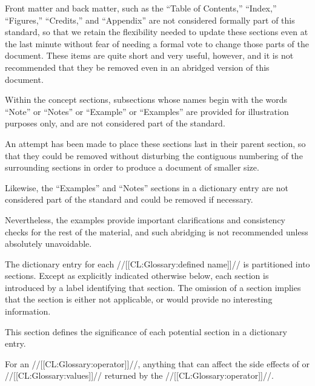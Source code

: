 \endlist

\endsubSection%

 

Front matter and back matter, such as the ``Table of Contents,''  ``Index,'' ``Figures,'' ``Credits,'' and ``Appendix'' are not considered formally  part of this standard, so that we retain the flexibility needed to update these sections even at the last minute without fear of needing a formal  vote to change those parts of the document.  These items are quite short  and very useful, however, and it is not recommended that they be removed  even in an abridged version of this document.

Within the concept sections, subsections whose names begin with  the words ``Note'' or ``Notes'' or ``Example'' or ``Examples''  are provided for illustration purposes only, and are not considered part of the standard.

An attempt has been made to place these sections last in their parent section, so that they could be removed without disturbing the contiguous numbering of the  surrounding sections in order to produce a document of smaller size.

Likewise, the ``Examples'' and ``Notes'' sections in a dictionary entry are not considered part of the standard and could be removed if necessary.

Nevertheless, the examples provide important clarifications and consistency  checks for the rest of the material, and such abridging is not recommended unless absolutely unavoidable.

\endsubsection%

 

The dictionary entry for each //[[CL:Glossary:defined name]]// is partitioned into sections.  Except as explicitly indicated otherwise below, each section is introduced by a label identifying that section.  The omission of a section implies that the section is either not applicable, or would provide no interesting information.

This section defines the significance of each potential section in a dictionary entry.


For an //[[CL:Glossary:operator]]//, anything that can affect the side effects of or //[[CL:Glossary:values]]// returned by the //[[CL:Glossary:operator]]//.

